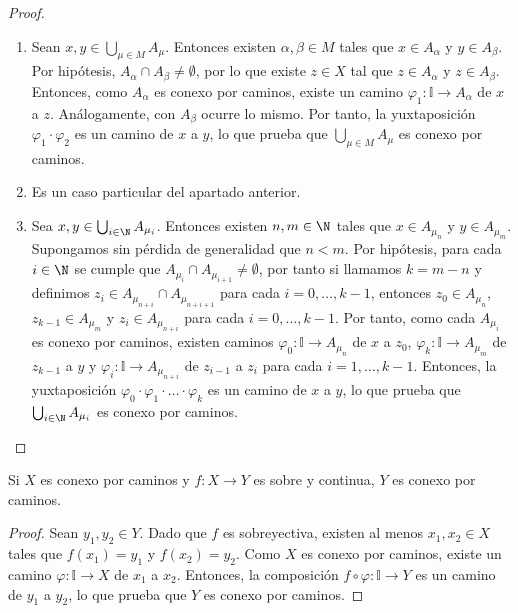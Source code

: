 \begin{proof}
    \begin{enumerate}
        \item Sean $x, y \in \bigcup_{\mu \in M} A_\mu$. Entonces existen $\alpha, \beta \in M$ tales que $x \in A_\alpha$ y $y \in A_\beta$. Por hipótesis, $A_\alpha \cap A_\beta \neq \emptyset$, por lo que existe $z \in X$ tal que $z \in A_\alpha$ y $z \in A_\beta$. Entonces, como $A_\alpha$ es conexo por caminos, existe un camino $\varphi_1 \colon \mathbb{I} \to A_\alpha$ de $x$ a $z$. Análogamente, con $A_\beta$ ocurre lo mismo. Por tanto, la yuxtaposición $\varphi_1 \cdot \varphi_2$ es un camino de $x$ a $y$, lo que prueba que $\bigcup_{\mu \in M} A_\mu$ es conexo por caminos.
        \item Es un caso particular del apartado anterior.
        \item Sea $x, y \in \bigcup_{i \in \N} A_{\mu_i}$. Entonces existen $n, m \in \N$ tales que $x \in A_{\mu_n}$ y $y \in A_{\mu_m}$. Supongamos sin pérdida de generalidad que $n < m$. Por hipótesis, para cada $i \in \N$ se cumple que $A_{\mu_i} \cap A_{\mu_{i+1}} \neq \emptyset$, por tanto si llamamos $k = m - n$ y definimos $z_i \in A_{\mu_{n+i}} \cap A_{\mu_{n+i+1}}$ para cada $i = 0, \dots, k - 1$, entonces $z_0 \in A_{\mu_n}$, $z_{k-1} \in A_{\mu_m}$ y $z_i \in A_{\mu_{n+i}}$ para cada $i = 0, \dots, k - 1$. Por tanto, como cada $A_{\mu_i}$ es conexo por caminos, existen caminos $\varphi_0 \colon \mathbb{I} \to A_{\mu_n}$ de $x$ a $z_0$, $\varphi_k \colon \mathbb{I} \to A_{\mu_m}$ de $z_{k-1}$ a $y$ y $\varphi_i \colon \mathbb{I} \to A_{\mu_{n+i}}$ de $z_{i-1}$ a $z_i$ para cada $i = 1, \dots, k - 1$. Entonces, la yuxtaposición $\varphi_0 \cdot \varphi_1 \cdot \dots \cdot \varphi_k$ es un camino de $x$ a $y$, lo que prueba que $\bigcup_{i \in \N} A_{\mu_i}$ es conexo por caminos.
    \end{enumerate}
\end{proof}
\begin{proposición}
    Si $X$ es conexo por caminos y $f \colon X \to Y$ es sobre y continua, $Y$ es conexo por caminos.
\end{proposición}
\begin{proof}
    Sean $y_1, y_2 \in Y$. Dado que $f$ es sobreyectiva, existen al menos $x_1, x_2 \in X$ tales que $f(x_1) = y_1$ y $f(x_2) = y_2$. Como $X$ es conexo por caminos, existe un camino $\varphi \colon \mathbb{I} \to X$ de $x_1$ a $x_2$. Entonces, la composición $f \circ \varphi \colon \mathbb{I} \to Y$ es un camino de $y_1$ a $y_2$, lo que prueba que $Y$ es conexo por caminos.
\end{proof}
